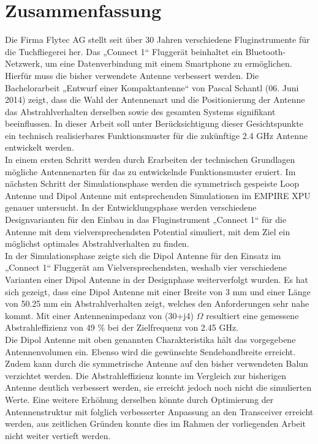 \newpage
\section*{Zusammenfassung}

Die Firma Flytec AG stellt seit über 30 Jahren verschiedene Fluginstrumente für die Tuchfliegerei her. Das „Connect 1“ Fluggerät beinhaltet ein Bluetooth-Netzwerk, um eine Datenverbindung mit einem Smartphone zu ermöglichen. Hierfür muss die bisher verwendete Antenne verbessert werden. Die Bachelorarbeit „Entwurf einer Kompaktantenne“ von Pascal Schantl (06. Juni 2014) zeigt, dass die Wahl der Antennenart und die Positionierung der Antenne das Abstrahlverhalten derselben sowie des gesamten Systems signifikant beeinflussen. In dieser Arbeit soll unter Berücksichtigung dieser Gesichtspunkte ein technisch realisierbares Funktionsmuster für die zukünftige 2.4 GHz Antenne entwickelt werden.\\ 
In einem ersten Schritt werden durch Erarbeiten der technischen Grundlagen mögliche Antennenarten für das zu entwickelnde Funktionsmuster eruiert. Im nächsten Schritt der Simulationsphase werden die symmetrisch gespeiste Loop Antenne und Dipol Antenne mit entsprechenden Simulationen im EMPIRE XPU genauer untersucht. In der Entwicklungsphase werden verschiedene Designvarianten für den Einbau in das Fluginstrument „Connect 1“ für die Antenne mit dem vielversprechendsten Potential simuliert, mit dem Ziel ein möglichst optimales Abstrahlverhalten zu finden.\\
In der Simulationsphase zeigte sich die Dipol Antenne für den Einsatz im „Connect 1“ Fluggerät am Vielversprechendsten, weshalb vier verschiedene Varianten einer Dipol Antenne in der Designphase weiterverfolgt wurden. Es hat sich gezeigt, dass eine Dipol Antenne mit einer Breite von 3 mm und einer Länge von 50.25 mm ein Abstrahlverhalten zeigt, welches den Anforderungen sehr nahe kommt. Mit einer Antennenimpedanz von (30+j4) $\Omega$ resultiert eine gemessene Abstrahleffizienz von 49 $\%$ bei der  Zielfrequenz von 2.45 GHz.\\
Die Dipol Antenne mit oben genannten Charakteristika hält das vorgegebene Antennenvolumen ein. Ebenso wird die gewünschte Sendebandbreite erreicht. Zudem kann durch die symmetrische Antenne auf den bisher verwendeten Balun verzichtet werden. Die Abstrahleffizienz konnte im Vergleich zur bisherigen Antenne deutlich verbessert werden, sie erreicht jedoch noch nicht die simulierten Werte. Eine weitere Erhöhung derselben könnte durch Optimierung der Antennenstruktur mit folglich verbesserter Anpassung an den Transceiver erreicht werden, aus zeitlichen Gründen konnte dies im Rahmen der vorliegenden Arbeit nicht weiter vertieft werden.




